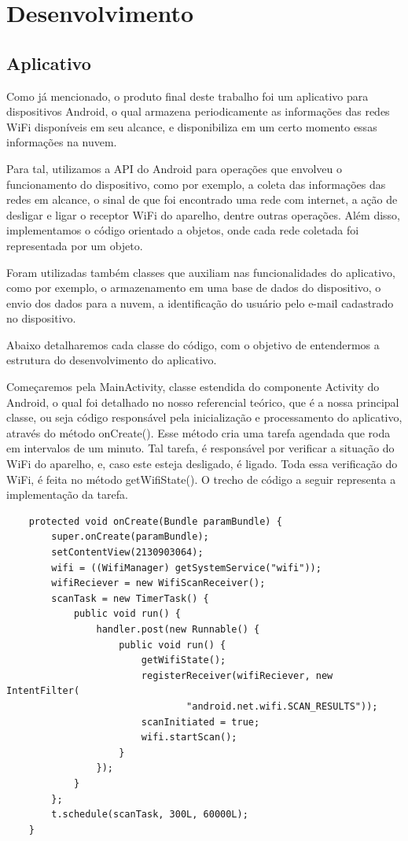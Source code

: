 \documentclass[12pt, %
openright, 
oneside,
a4paper,
brazil]{facom-ufu-abntex2}
\begin{document}
\chapter{Desenvolvimento}

\section{Aplicativo}
Como já mencionado, o produto final deste trabalho foi um aplicativo para dispositivos Android, o qual armazena periodicamente as informações das redes \ac{WiFi} disponíveis em seu alcance, e disponibiliza em um certo momento essas informações na nuvem.

Para tal, utilizamos a \ac{API} do Android para operações que envolveu o funcionamento do dispositivo, como por exemplo, a coleta das informações das redes em alcance, o sinal de que foi encontrado uma rede com internet, a ação de desligar e ligar o receptor \ac{WiFi} do aparelho, dentre outras operações. Além disso, implementamos o código orientado a objetos, onde cada rede coletada foi representada por um objeto.

Foram utilizadas também classes que auxiliam nas funcionalidades do aplicativo, como por exemplo, o armazenamento em uma base de dados do dispositivo, o envio dos dados para a nuvem, a identificação do usuário pelo e-mail cadastrado no dispositivo.

Abaixo detalharemos cada classe do código, com o objetivo de entendermos a estrutura do desenvolvimento do aplicativo.

Começaremos pela MainActivity, classe estendida do componente Activity do Android, o qual foi detalhado no nosso referencial teórico, que é a nossa principal classe, ou seja código responsável pela inicialização e processamento do aplicativo, através do método onCreate(). Esse método cria uma tarefa agendada que roda em intervalos de um minuto. Tal tarefa, é responsável por verificar a situação do \ac{WiFi} do aparelho, e, caso este esteja desligado, é ligado. Toda essa verificação do \ac{WiFi}, é feita no método getWifiState(). O trecho de código a seguir representa a implementação da tarefa.
\begin{lstlisting}
	protected void onCreate(Bundle paramBundle) {
		super.onCreate(paramBundle);
		setContentView(2130903064);
		wifi = ((WifiManager) getSystemService("wifi"));
		wifiReciever = new WifiScanReceiver();
		scanTask = new TimerTask() {
			public void run() {
				handler.post(new Runnable() {
					public void run() {
						getWifiState();
						registerReceiver(wifiReciever, new IntentFilter(
								"android.net.wifi.SCAN_RESULTS"));
						scanInitiated = true;
						wifi.startScan();
					}
				});
			}
		};
		t.schedule(scanTask, 300L, 60000L);
	}
\end{lstlisting}
\end{document}
